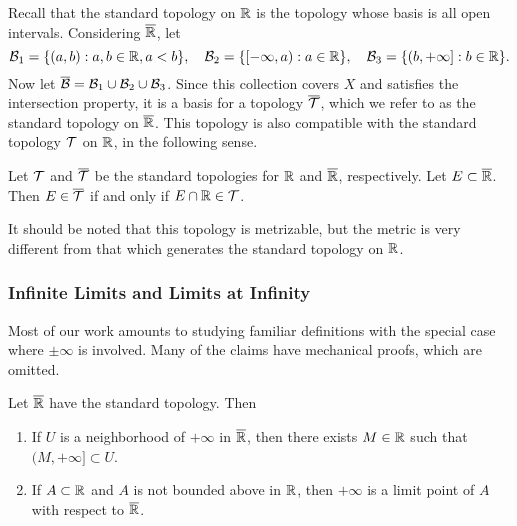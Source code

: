 \documentclass[12pt]{article} %
\begin{document}
Recall that the standard topology on $\mathbb{R}$ is the topology whose basis is all open intervals. Considering $\overline{\mathbb{R}}$, let \[\mathcal{B}_1 = \{(a, b) :  a, b \in \mathbb{R}, a < b\}, \ \ \ \mathcal{B}_2 = \{[-\infty, a) : a \in \mathbb{R}\}, \ \ \ \mathcal{B}_3 = \{(b, + \infty] : b \in \mathbb{R}\}.\] Now let $\overline{\mathcal{B}} = \mathcal{B}_1 \cup \mathcal{B}_2 \cup \mathcal{B}_3$. Since this collection covers $X$ and satisfies the intersection property, it is a basis for a topology $\overline{\mathcal{T}}$, which we refer to as the standard topology on $\overline{\mathbb{R}}$. This topology is also compatible with the standard topology $\mathcal{T}$ on $\mathbb{R}$, in the following sense.

\begin{proposition}
    Let $\mathcal{T}$ and $\overline{\mathcal{T}}$ be the standard topologies for $\mathbb{R}$ and $\overline{\mathbb{R}}$, respectively. Let $E \subset \overline{\mathbb{R}}$. Then $E \in \overline{\mathcal{T}}$ if and only if $E \cap \mathbb{R} \in \mathcal{T}$.
\end{proposition}

\noindent It should be noted that this topology is metrizable, but the metric is very different from that which generates the standard topology on $\mathbb{R}$.

\subsubsection{Infinite Limits and Limits at Infinity}

Most of our work amounts to studying familiar definitions with the special case where $\pm \infty$ is involved. Many of the claims have mechanical proofs, which are omitted.

\begin{proposition}
    Let $\overline{\mathbb{R}}$ have the standard topology. Then \begin{enumerate}
        \item If $U$ is a neighborhood of $+\infty$ in $\overline{\mathbb{R}}$, then there exists $M \in \mathbb{R}$ such that $(M, +\infty] \subset U$.
        \item If $A \subset \mathbb{R}$ and $A$ is not bounded above in $\mathbb{R}$, then $+\infty$ is a limit point of $A$ with respect to $\overline{\mathbb{R}}$.
    \end{enumerate}
\end{proposition}
\end{document}

